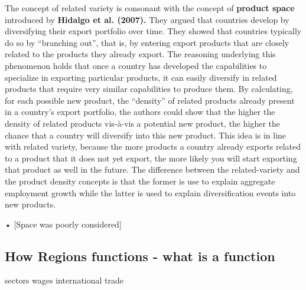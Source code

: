 The concept of related variety is consonant with the concept of \textbf{product space} introduced by \textbf{Hidalgo et al. (2007).} They argued that countries develop by diversifying their export portfolio over time. They showed that countries typically do so by “branching out”, that is, by entering export products that are closely related to the products they already export. The reasoning underlying this phenomenon holds that once a country has developed the capabilities to specialize in exporting particular products, it can easily diversify in related products that require very similar capabilities to produce them. By calculating, for each possible new product, the “density” of related products already present in a country’s export portfolio, the authors could show that the higher the density of related products vis-à-vis a potential new product, the higher the chance that a country will diversify into this new product. This idea is in line with related variety, because the more products a country already exports related to a product that it does not yet export, the more likely you will start exporting that product as well in the future. The difference between the related-variety and the product density concepts is that the former is use to explain aggregate employment growth while the latter is used to explain diversification events into new products.



•	[Space was poorly considered]\par 



\subsection{How Regions functions - what is a function}
 sectors
 wages
 international trade
 




